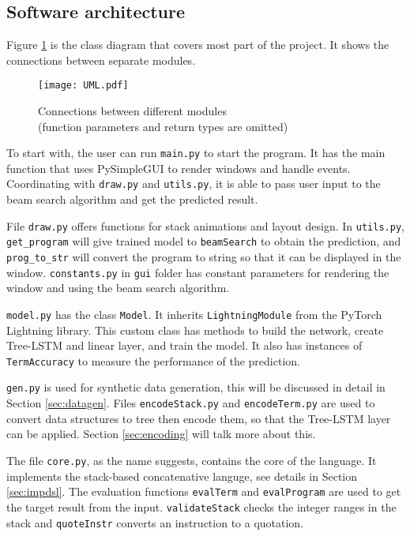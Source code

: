 \subsection{Software architecture}
Figure \ref{fig:uml} is the class diagram that covers most part of the project. It shows the connections between separate modules. 
\begin{figure}[H]
    \centering
    \texttt{[image: UML.pdf]}
     \caption[Connections between different modules; (function parameters and return types are omitted)]
    {Connections between different modules \\ (function parameters and return types are omitted)\endtabular}
    \label{fig:uml}
\end{figure}
To start with, the user can run \texttt{main.py} to start the program. It has the main function that uses PySimpleGUI \cite{psgui} to render windows and handle events. Coordinating with \texttt{draw.py} and \texttt{utils.py}, it is able to pass user input to the beam search algorithm and get the predicted result.

File \texttt{draw.py} offers functions for stack animations and layout design. In \texttt{utils.py}, \texttt{get\_program} will give trained model to \texttt{beamSearch} to obtain the prediction, and \texttt{prog\_to\_str} will convert the program to string so that it can be displayed in the window.  \texttt{constants.py} in \texttt{gui} folder has constant parameters for rendering the window and using the beam search algorithm.

\texttt{model.py} has the class \texttt{Model}. It inherits \texttt{LightningModule} from the PyTorch Lightning \cite{pytorch-ligntning} library. This custom class has methods to build the network, create Tree-LSTM and linear layer, and train the model. It also has instances of \texttt{TermAccuracy} to measure the performance of the prediction.

\texttt{gen.py} is used for synthetic data generation, this will be discussed in detail in Section \ref{sec:datagen}. Files \texttt{encodeStack.py} and \texttt{encodeTerm.py} are used to convert data structures to tree then encode them, so that the Tree-LSTM layer can be applied. Section \ref{sec:encoding} will talk more about this.

The file \texttt{core.py}, as the name suggests, contains the core of the language. It implements the stack-based concatenative languge, see details in Section \ref{sec:impdsl}. The evaluation functions \texttt{evalTerm} and \texttt{evalProgram} are used to get the target result from the input. \texttt{validateStack} checks the integer ranges in the stack and \texttt{quoteInstr} converts an instruction to a quotation.

